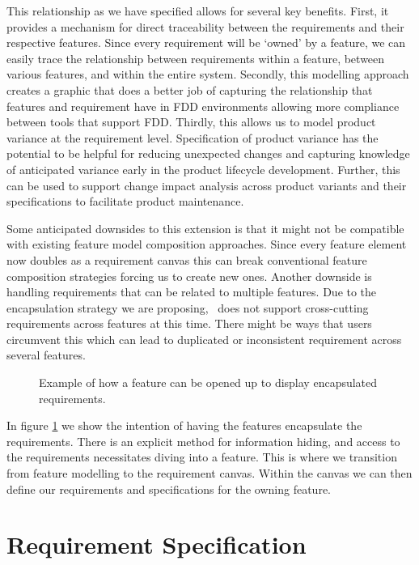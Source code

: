 This relationship as we have specified allows for several key benefits. First, it provides a mechanism for direct traceability between the requirements and their respective features. Since every requirement will be `owned' by a feature, we can easily trace the relationship between requirements within a feature, between various features, and within the entire system. Secondly, this modelling approach creates a graphic that does a better job of capturing the relationship that features and requirement have in \ac{FDD} environments allowing more compliance between tools that support \ac{FDD}. Thirdly, this allows us to model product variance at the requirement level. Specification of product variance has the potential to be helpful for reducing unexpected changes and capturing knowledge of anticipated variance early in the product lifecycle development. Further, this can be used to support change impact analysis across product variants and their specifications to facilitate product maintenance. 

Some anticipated downsides to this extension is that it might not be compatible with existing feature model composition approaches. Since every feature element now doubles as a requirement canvas this can break conventional feature composition strategies forcing us to create new ones. Another downside is handling requirements that can be related to multiple features. Due to the encapsulation strategy we are proposing, \tool\ does not support cross-cutting requirements across features at this time. There might be ways that users circumvent this which can lead to duplicated or inconsistent requirement across several features. 

\begin{figure}
	\centering
	
	\caption{Example of how a feature can be opened up to display encapsulated requirements.}
	\label{fig:feature-requirement}
\end{figure}

In figure \ref{fig:feature-requirement} we show the intention of having the features encapsulate the requirements. There is an explicit method for information hiding, and access to the requirements necessitates diving into a feature. This is where we transition from feature modelling to the requirement canvas. Within the canvas we can then define our requirements and specifications for the owning feature. 

\section{Requirement Specification}

